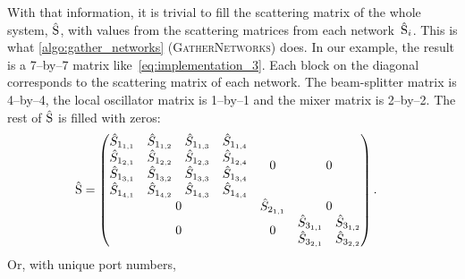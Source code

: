With that information, it is trivial to fill the scattering matrix of the whole system, $\hat{\mathrm{S}}$, with values from the scattering matrices from each network~$\hat{\mathrm{S}}_i$.
This is what \cref{algo:gather_networks} (\textsc{GatherNetworks}) does.
In our example, the result is a 7--by--7 matrix like~\cref{eq:implementation_3}.
Each block on the diagonal corresponds to the scattering matrix of each network.
The beam-splitter matrix is 4--by--4, the local oscillator matrix is 1--by--1 and the mixer matrix is 2--by--2.
The rest of $\hat{\mathrm{S}}$ is filled with zeros:
\begin{align}
    \hat{\mathrm{S}}
    &=
    \begin{pmatrix}
        \begin{matrix}
            \hat{S}_{1_{1,1}} & \hat{S}_{1_{1,2}} & \hat{S}_{1_{1,3}} & \hat{S}_{1_{1,4}} \\
            \hat{S}_{1_{2,1}} & \hat{S}_{1_{2,2}} & \hat{S}_{1_{2,3}} & \hat{S}_{1_{2,4}} \\
            \hat{S}_{1_{3,1}} & \hat{S}_{1_{3,2}} & \hat{S}_{1_{3,3}} & \hat{S}_{1_{3,4}} \\
            \hat{S}_{1_{4,1}} & \hat{S}_{1_{4,2}} & \hat{S}_{1_{4,3}} & \hat{S}_{1_{4,4}}
        \end{matrix}
        & 0 & 0
        \\
        0 &
        \begin{matrix}
            \hat{S}_{2_{1,1}}
        \end{matrix}
        & 0
        \\
        0&0&
        \begin{matrix}
            \hat{S}_{3_{1,1}} & \hat{S}_{3_{1,2}}\\
            \hat{S}_{3_{2,1}} & \hat{S}_{3_{2,2}}
        \end{matrix}
    \end{pmatrix}\text{.}
\end{align}
Or, with unique port numbers,

